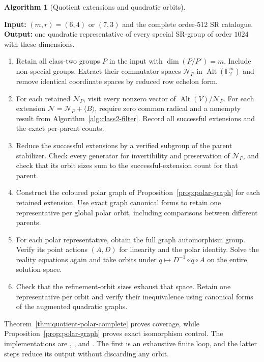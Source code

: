 \documentclass[11pt,a4paper]{amsart}
\theoremstyle{definition}
\newtheorem{algorithm}{Algorithm}
\theoremstyle{remark}
\DeclareMathOperator{\Alt}{Alt}
\numberwithin{equation}{section}
\begin{document}
\par\noindent\begin{minipage}{\linewidth}
\begin{algorithm}[Quotient extensions and quadratic orbits]\label{alg:quotient-orbits}
\leavevmode\par
\textbf{Input:} $(m,r)=(6,4)$ or $(7,3)$ and the complete order-512 SR
catalogue. \textbf{Output:} one quadratic representative of every special
SR-group of order $1024$ with these dimensions.
\begin{enumerate}
\item Retain all class-two groups $P$ in the input with
$\dim(P/P')=m$. Include non-special groups. Extract their commutator
spaces $\mathcal N_P$ in $\Alt(\mathbb F_2^m)$ and remove identical
coordinate spaces by reduced row echelon form.
\item For each retained $\mathcal N_P$, visit every nonzero vector
of $\Alt(V)/\mathcal N_P$. For each extension
$\mathcal N=\mathcal N_P+\langle B\rangle$, require zero common
radical and a nonempty result from Algorithm~\ref{alg:class2-filter}.
Record all successful extensions and the exact per-parent counts.
\item Reduce the successful extensions by a verified subgroup of the
parent stabilizer. Check every generator for invertibility and
preservation of $\mathcal N_P$, and check that its orbit sizes sum
to the successful-extension count for that parent.
\item Construct the coloured polar graph of
Proposition~\ref{prop:polar-graph} for each retained extension. Use
exact graph canonical forms to retain one representative per global
polar orbit, including comparisons between different parents.
\item For each polar representative, obtain the full graph
automorphism group. Verify its point actions $(A,D)$ for linearity
and the polar identity. Solve the reality equations again and take
orbits under $q\mapsto D^{-1}\circ q\circ A$ on the entire solution space.
\item Check that the refinement-orbit sizes exhaust that space.
Retain one representative per orbit and verify their inequivalence
using canonical forms of the augmented quadratic graphs.
\end{enumerate}
\end{algorithm}
\end{minipage}\par\medskip
Theorem~\ref{thm:quotient-polar-complete} proves coverage, while
Proposition~\ref{prop:polar-graph} proves exact isomorphism control.
The implementations are ,
, and
. The first is an exhaustive finite loop,
and the latter steps reduce its output without discarding any orbit.
\end{document}
